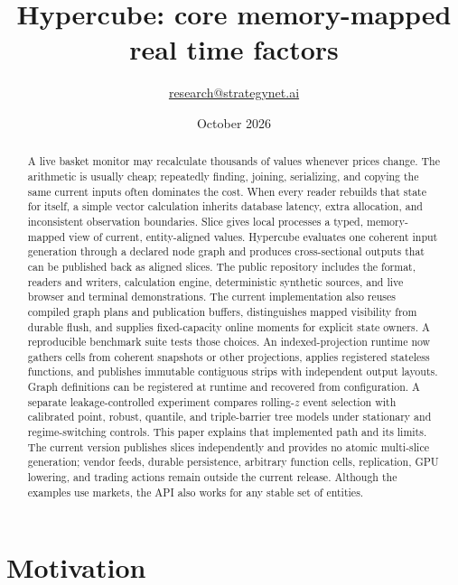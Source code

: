 \documentclass{strategynet-journal}
\title{Hypercube: core memory-mapped real time factors}
\author{\href{mailto:research@strategynet.ai}{research@strategynet.ai}}
\date{October 2026}
\newcommand{\SLICE}{\textsf{Slice}}
\begin{document}
\maketitle

\begin{abstract}
A live basket monitor may recalculate thousands of values whenever prices
change.  The arithmetic is usually cheap; repeatedly finding, joining,
serializing, and copying the same current inputs often dominates the cost.  When every reader
rebuilds that state for itself, a simple vector calculation inherits database
latency, extra allocation, and inconsistent observation boundaries.
\SLICE{} gives local processes a typed, memory-mapped view of current,
entity-aligned values.  Hypercube evaluates one coherent input generation
through a declared node graph and produces cross-sectional outputs that can be
published back as aligned slices.  The public repository includes the format,
readers and writers, calculation engine, deterministic synthetic sources, and
live browser and terminal demonstrations.  The current implementation also
reuses compiled graph plans and publication buffers, distinguishes mapped
visibility from durable flush, and supplies fixed-capacity online moments for
explicit state owners.  A reproducible benchmark suite tests those choices.
An indexed-projection runtime now gathers cells from coherent snapshots or
other projections, applies registered stateless functions, and publishes
immutable contiguous strips with independent output layouts.  Graph definitions
can be registered at runtime and recovered from configuration.
A separate leakage-controlled experiment compares rolling-\(z\) event selection
with calibrated point, robust, quantile, and triple-barrier tree models under
stationary and regime-switching controls.
This paper explains that implemented path and its limits.  The current version
publishes slices independently and provides no atomic multi-slice generation;
vendor feeds, durable persistence, arbitrary function
cells, replication, GPU lowering, and trading actions remain outside the
current release.  Although the examples use markets, the API also works for
any stable set of entities.
\end{abstract}

\SNtwocolumntableofcontents

\part{Motivation}
\end{document}
